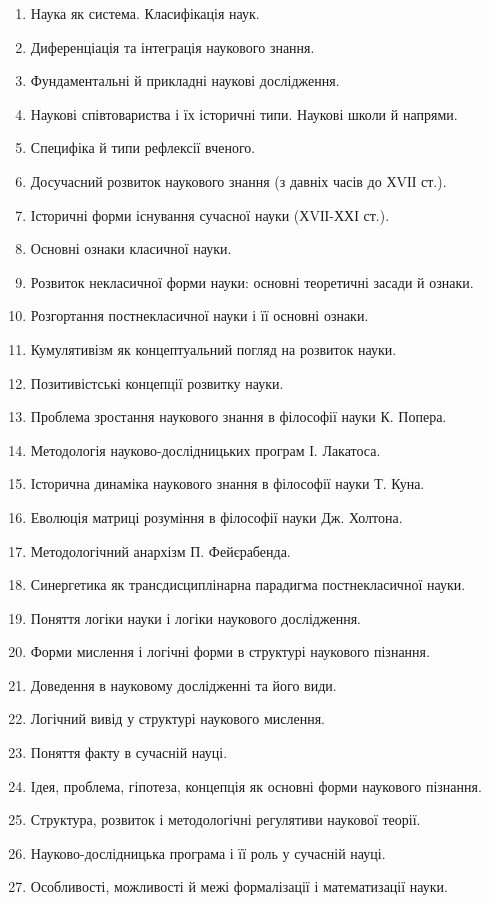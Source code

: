 \begin{enumerate}
\item Наука як система. Класифікація наук.
\item Диференціація та інтеграція наукового знання.
\item Фундаментальні й прикладні наукові дослідження.
\item Наукові співтовариства і їх історичні типи. Наукові школи й напрями.
\item Специфіка й типи рефлексії вченого. 
\item Досучасний розвиток наукового знання (з давніх часів до ХVІІ ст.).
\item Історичні форми існування сучасної науки (ХVІІ-ХХІ ст.).
\item Основні ознаки класичної науки.
\item Розвиток некласичної форми науки: основні теоретичні засади й ознаки.
\item Розгортання постнекласичної науки і її основні ознаки.
\item Кумулятивізм як концептуальний погляд на розвиток науки.
\item Позитивістські концепції розвитку науки.
\item Проблема зростання наукового знання в філософії науки К. Попера.
\item Методологія науково-дослідницьких програм І. Лакатоса.
\item Історична динаміка наукового знання в філософії науки Т. Куна.
\item Еволюція матриці розуміння в філософії науки Дж. Холтона.
\item Методологічний анархізм П. Фейєрабенда.
\item Синергетика як трансдисциплінарна парадигма постнекласичної науки.
\item Поняття логіки науки і логіки наукового дослідження.
\item Форми мислення і логічні форми в структурі наукового пізнання.
\item Доведення в науковому дослідженні та його види.
\item Логічний вивід у структурі наукового мислення.
\item Поняття факту в сучасній науці.
\item Ідея, проблема, гіпотеза, концепція як основні форми наукового пізнання.
\item Структура, розвиток і методологічні регулятиви наукової теорії.
\item Науково-дослідницька програма і її роль у сучасній науці.
\item Особливості, можливості й межі формалізації і математизації науки.

\end{enumerate}

